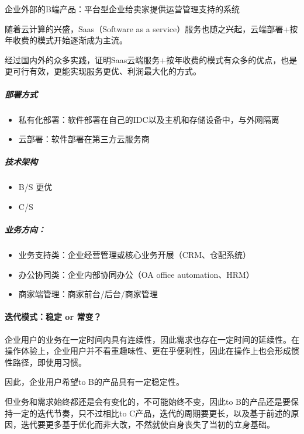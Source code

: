 \documentclass[letterpaper,11pt,english]{sphinxmanual}
\begin{document}
企业外部的B端产品：平台型企业给卖家提供运营管理支持的系统

随着云计算的兴盛，Saas（Software as a
service）服务也随之兴起，云端部署+按年收费的模式开始逐渐成为主流。

经过国内外的众多实践，证明Saas云端服务+按年收费的模式有众多的优点，也是更可行有效，更能实现服务更优、利润最大化的方式。


\subparagraph{部署方式}
\label{\detokenize{chapter_introduction/2B:id9}}\begin{itemize}
\item {} 
私有化部署：软件部署在自己的IDC以及主机和存储设备中，与外网隔离

\item {} 
云部署：软件部署在第三方云服务商

\end{itemize}


\subparagraph{技术架构}
\label{\detokenize{chapter_introduction/2B:id10}}\begin{itemize}
\item {} 
B/S 更优

\item {} 
C/S

\end{itemize}


\subparagraph{业务方向：}
\label{\detokenize{chapter_introduction/2B:id11}}\begin{itemize}
\item {} 
业务支持类：企业经营管理或核心业务开展（CRM、仓配系统）

\item {} 
办公协同类：企业内部协同办公（OA office automation、HRM）

\item {} 
商家端管理：商家前台/后台/商家管理

\end{itemize}


\paragraph{迭代模式：稳定 or 常变？}
\label{\detokenize{chapter_introduction/2B:or}}
企业用户的业务在一定时间内具有连续性，因此需求也存在一定时间的延续性。在操作体验上，企业用户并不看重趣味性、更在乎便利性，因此在操作上也会形成惯性路径，即使用习惯。

因此，企业用户希望to B的产品具有一定稳定性。

但业务和需求始终都还是会有变化的，不可能始终不变，因此to
B的产品还是要保持一定的迭代节奏，只不过相比to
C产品，迭代的周期要更长，以及基于前述的原因，迭代要更多基于优化而非大改，不然就使自身丧失了当初的立身基础。
\end{document}
